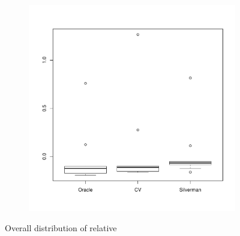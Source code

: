\begin{figure}[htbp]
\begin{subfigure}[t]{0.45\textwidth}
        \includegraphics[width=\textwidth]{results/by_overall/relative-centroid-bias-peakpop-boxplot}
        \label{fig:discussion:overall_centroidbias_boxplot:peak}
    \end{subfigure}
    \caption{Overall distribution of relative }
    \label{fig:discussion:overall_centroidbias_boxplot}
\end{figure}

